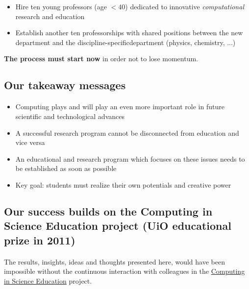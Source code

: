 \documentclass[%
<<<<<<< HEAD
<<<<<<< HEAD
oneside,                 %
final,                   %
=======
twoside,                 %
final,                   %
>>>>>>> 5fc06d357468ca5ec59d2d3ed0179709275f8f00
=======
oneside,                 %
final,                   %
>>>>>>> master
10pt]{article}
\begin{document}
\begin{itemize}
\begin{itemize}
\item Hire ten young professors (age $< 40$) dedicated to innovative \emph{computational} research and education

\item Establish another ten professorships with  shared positions between the  new department and the discipline-specificdepartment (physics, chemistry, ...)
\end{itemize}

\noindent



\textbf{The process must start now} in order not to lose momentum.



\subsection*{Our takeaway messages}

\paragraph{}
\begin{itemize}
\item Computing plays and will play an even more important role in future scientific and technological advances

\item A successful research program cannot be disconnected from education and vice versa

\item An educational and research program which focuses on these issues needs to be established as soon as possible

\item Key goal: students must realize their own potentials and creative power
\end{itemize}

\noindent




\subsection*{Our success builds on the Computing in Science Education project (UiO educational prize in 2011)}


\paragraph{}
The results, insights, ideas and thoughts presented here, would have been impossible without the continuous interaction with colleagues in the \href{{http://www.mn.uio.no/english/about/collaboration/cse/}}{Computing in Science Education} project.


\end{itemize}
\end{document}
